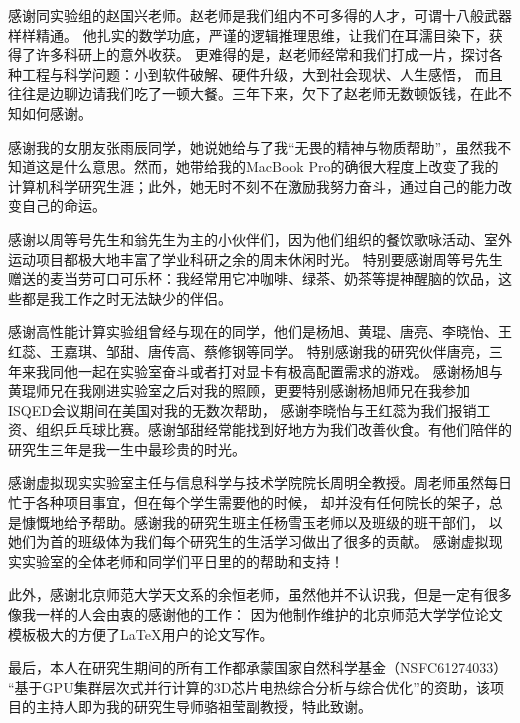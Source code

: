 \begin{ack}
感谢同实验组的赵国兴老师。赵老师是我们组内不可多得的人才，可谓十八般武器样样精通。 他扎实的数学功底，严谨的逻辑推理思维，让我们在耳濡目染下，获得了许多科研上的意外收获。 更难得的是，赵老师经常和我们打成一片，探讨各种工程与科学问题：小到软件破解、硬件升级，大到社会现状、人生感悟， 而且往往是边聊边请我们吃了一顿大餐。三年下来，欠下了赵老师无数顿饭钱，在此不知如何感谢。

感谢我的女朋友张雨辰同学，她说她给与了我“无畏的精神与物质帮助”，虽然我不知道这是什么意思。然而，她带给我的MacBook Pro的确很大程度上改变了我的计算机科学研究生涯；此外，她无时不刻不在激励我努力奋斗，通过自己的能力改变自己的命运。

感谢以周等号先生和翁先生为主的小伙伴们，因为他们组织的餐饮歌咏活动、室外运动项目都极大地丰富了学业科研之余的周末休闲时光。 特别要感谢周等号先生赠送的麦当劳可口可乐杯：我经常用它冲咖啡、绿茶、奶茶等提神醒脑的饮品，这些都是我工作之时无法缺少的伴侣。

感谢高性能计算实验组曾经与现在的同学，他们是杨旭、黄琨、唐亮、李晓怡、王红蕊、王嘉琪、邹甜、唐传高、蔡修钢等同学。 特别感谢我的研究伙伴唐亮，三年来我同他一起在实验室奋斗或者打对显卡有极高配置需求的游戏。 感谢杨旭与黄琨师兄在我刚进实验室之后对我的照顾，更要特别感谢杨旭师兄在我参加ISQED会议期间在美国对我的无数次帮助， 感谢李晓怡与王红蕊为我们报销工资、组织乒乓球比赛。感谢邹甜经常能找到好地方为我们改善伙食。有他们陪伴的研究生三年是我一生中最珍贵的时光。

感谢虚拟现实实验室主任与信息科学与技术学院院长周明全教授。周老师虽然每日忙于各种项目事宜，但在每个学生需要他的时候， 却并没有任何院长的架子，总是慷慨地给予帮助。感谢我的研究生班主任杨雪玉老师以及班级的班干部们， 以她们为首的班级体为我们每个研究生的生活学习做出了很多的贡献。 感谢虚拟现实实验室的全体老师和同学们平日里的的帮助和支持！

此外，感谢北京师范大学天文系的余恒老师，虽然他并不认识我，但是一定有很多像我一样的人会由衷的感谢他的工作： 因为他制作维护的北京师范大学学位论文模板极大的方便了\LaTeX{}用户的论文写作。

最后，本人在研究生期间的所有工作都承蒙国家自然科学基金（NSFC61274033） “基于GPU集群层次式并行计算的3D芯片电热综合分析与综合优化”的资助，该项目的主持人即为我的研究生导师骆祖莹副教授，特此致谢。
\end{ack}
